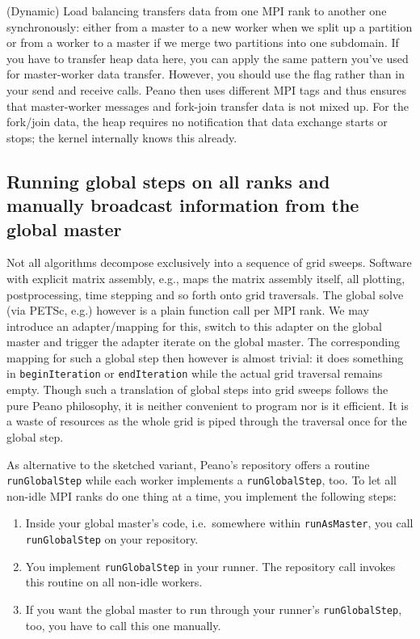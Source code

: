 \begin{remark}
(Dynamic) Load balancing transfers data from one MPI rank to another one
synchronously: either from a master to a new worker when we split up a partition
or from a worker to a master if we merge two partitions into one subdomain. If
you have to transfer heap data here, you can apply the same pattern you've used
for master-worker data transfer. However, you should use the flag  
 rather than 
 in your send and
receive calls.
Peano then uses different MPI tags and thus ensures that master-worker messages and fork-join
transfer data is not mixed up.
For the fork/join data, the heap requires no notification that data exchange
starts or stops; the kernel internally knows this already.
\end{remark}


\subsection{Running global steps on all ranks and manually broadcast
information from the global master}

Not all algorithms decompose exclusively into a sequence of grid sweeps. 
Software with explicit matrix assembly, e.g., maps the matrix assembly itself,
all plotting, postprocessing, time stepping and so forth onto grid traversals.
The global solve (via PETSc, e.g.) however is a plain function call per MPI
rank.
We may introduce an adapter/mapping for this, switch to this adapter on the
global master and trigger the adapter iterate on the global master.
The corresponding mapping for such a global step then however is almost trivial:
it does something in \texttt{beginIteration} or \texttt{endIteration} while the
actual grid traversal remains empty. 
Though such a translation of global steps into grid sweeps follows the pure
Peano philosophy, it is neither convenient to program nor is it efficient.
It is a waste of resources as the whole grid is piped through
the traversal once for the global step.


As alternative to the sketched variant, Peano's repository offers a
routine \texttt{runGlobalStep} while each worker implements a
\texttt{runGlobalStep}, too. 
To let all non-idle MPI ranks do one thing at a time, you implement the
following steps:

\begin{enumerate}
  \item Inside your global master's code, i.e.~somewhere within
  \texttt{runAsMaster}, you call \texttt{runGlobalStep} on your repository.
  \item You implement \texttt{runGlobalStep} in your runner. The repository call
  invokes this routine on all non-idle workers.
  \item If you want the global master to run through your runner's
  \texttt{runGlobalStep}, too, you have to call this one manually.
\end{enumerate}

